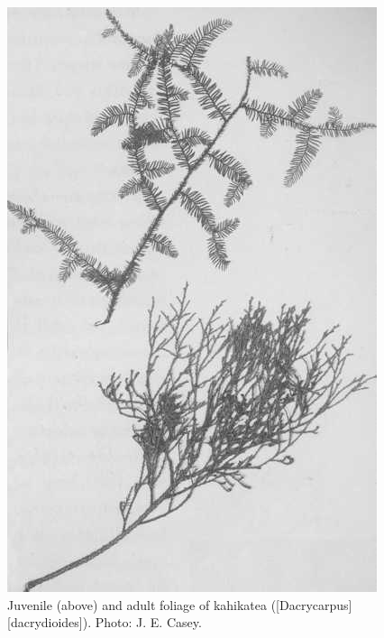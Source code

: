 \begin{figure}[htb]
\begin{minipage}[t]{0.475\textwidth}
    	\includegraphics[height=1.3\textwidth]{graphics/figure22kahikatea.jpg}
    	\caption[Kahikatea foliage]{Juvenile (above) and adult foliage of kahikatea ([Dacrycarpus][dacrydioides]).
    	Photo: J. E. Casey.}%
    	\label{fig:22kahikatea}
	\end{minipage}
\end{figure}

